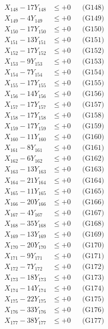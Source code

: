 \documentclass[a4paper,10pt]{article}
\begin{document}
{\begin{align}
X_{148} - 17Y_{148} &\leq +0 && \text{(G148)} \\
X_{149} - 4Y_{149} &\leq +0 && \text{(G149)} \\
X_{150} - 17Y_{150} &\leq +0 && \text{(G150)} \\
X_{151} - 13Y_{151} &\leq +0 && \text{(G151)} \\
X_{152} - 17Y_{152} &\leq +0 && \text{(G152)} \\
X_{153} - 9Y_{153} &\leq +0 && \text{(G153)} \\
X_{154} - 7Y_{154} &\leq +0 && \text{(G154)} \\
X_{155} - 17Y_{155} &\leq +0 && \text{(G155)} \\
X_{156} - 14Y_{156} &\leq +0 && \text{(G156)} \\
X_{157} - 17Y_{157} &\leq +0 && \text{(G157)} \\
\allowbreak
X_{158} - 17Y_{158} &\leq +0 && \text{(G158)} \\
X_{159} - 17Y_{159} &\leq +0 && \text{(G159)} \\
X_{160} - 11Y_{160} &\leq +0 && \text{(G160)} \\
X_{161} - 8Y_{161} &\leq +0 && \text{(G161)} \\
X_{162} - 6Y_{162} &\leq +0 && \text{(G162)} \\
X_{163} - 13Y_{163} &\leq +0 && \text{(G163)} \\
X_{164} - 21Y_{164} &\leq +0 && \text{(G164)} \\
X_{165} - 11Y_{165} &\leq +0 && \text{(G165)} \\
X_{166} - 20Y_{166} &\leq +0 && \text{(G166)} \\
X_{167} - 4Y_{167} &\leq +0 && \text{(G167)} \\
\allowbreak
X_{168} - 35Y_{168} &\leq +0 && \text{(G168)} \\
X_{169} - 13Y_{169} &\leq +0 && \text{(G169)} \\
X_{170} - 20Y_{170} &\leq +0 && \text{(G170)} \\
X_{171} - 9Y_{171} &\leq +0 && \text{(G171)} \\
X_{172} - 7Y_{172} &\leq +0 && \text{(G172)} \\
X_{173} - 18Y_{173} &\leq +0 && \text{(G173)} \\
X_{174} - 14Y_{174} &\leq +0 && \text{(G174)} \\
X_{175} - 22Y_{175} &\leq +0 && \text{(G175)} \\
X_{176} - 33Y_{176} &\leq +0 && \text{(G176)} \\
X_{177} - 38Y_{177} &\leq +0 && \text{(G177)} \\

\end{align}}
\end{document}
